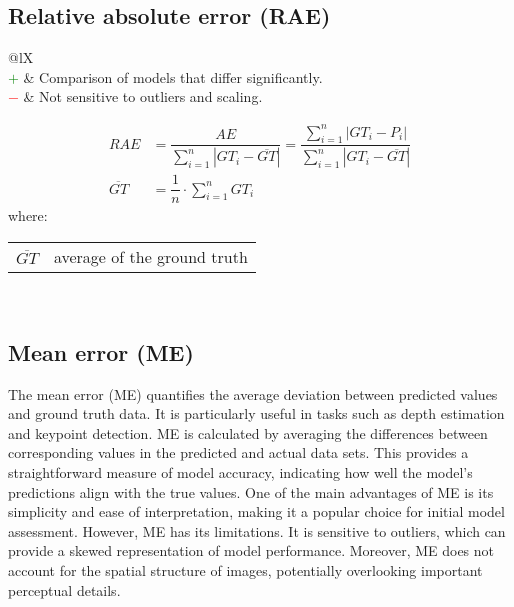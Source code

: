 \documentclass{article}
\makeatletter
\newenvironment{conditions}[1][where:]
    {\hspace{0.02\textwidth} #1 \begin{tabular}[t]{>{$}l<{$} @{${}={}$} l}}
    {\end{tabular}\\[\belowdisplayskip]}
\makeatother
\begin{document}
\subsection[Relative absolute error (RAE)]{Relative absolute error (RAE) \cite{armstrong1992error, armstrong2000another, rodrigues2017machine}}

\begin{table}[H]\centering
    \begin{tabularx}{\textwidth}{@{}lX}
        \multicolumn{2}{@{}X}{Normalization of the absolute error by dividing the total absolute error of the simple predictor. (range: $[0, \infty)$)} \\
        \textcolor{Green}{$+$} & Comparison of models that differ significantly. \\
        \textcolor{Red}{$-$}   & Not sensitive to outliers and scaling.
    \end{tabularx}
\end{table}

\begin{equation}
    \begin{aligned}
        \textit{RAE}           &= \dfrac{\textit{AE}}{\sum\nolimits_{i = 1}^n |\textit{GT}_i - \overline{\textit{GT}}|} = \dfrac{\sum\nolimits_{i = 1}^n |\textit{GT}_i - P_i|}{\sum\nolimits_{i = 1}^n |\textit{GT}_i - \overline{\textit{GT}}|} \\
        \overline{\textit{GT}} &= \dfrac{1}{n} \cdot \sum\nolimits_{i = 1}^n \textit{GT}_i
%
        \label{equation:RAE}
    \end{aligned}
\end{equation}
%
\begin{conditions}
    \overline{\textit{GT}} & average of the ground truth
\end{conditions}


\subsection[Mean error (ME)]{Mean error (ME) \cite{fisher1920012, anjali2019temperature}}

The mean error (ME) \cite{fisher1920012, anjali2019temperature} quantifies the average deviation between predicted values and ground truth data. It is particularly useful in tasks such as depth estimation and keypoint detection. ME is calculated by averaging the differences between corresponding values in the predicted and actual data sets. This provides a straightforward measure of model accuracy, indicating how well the model's predictions align with the true values. One of the main advantages of ME is its simplicity and ease of interpretation, making it a popular choice for initial model assessment. However, ME has its limitations. It is sensitive to outliers, which can provide a skewed representation of model performance. Moreover, ME does not account for the spatial structure of images, potentially overlooking important perceptual details.
\end{document}
